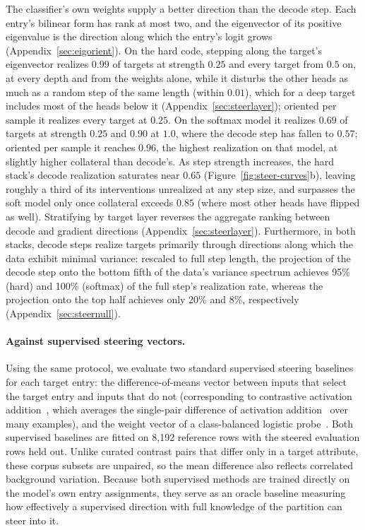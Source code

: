 The classifier's own weights supply a better direction than the decode step.
Each entry's bilinear form has rank at most two, and the eigenvector of its
positive eigenvalue is the direction along which the entry's logit grows
(Appendix~\ref{sec:eigorient}). On the hard code, stepping along the
target's eigenvector realizes $0.99$ of targets at strength $0.25$ and every
target from $0.5$ on, at every depth and from the weights alone, while it
disturbs the other heads as much as a random step of the same length (within
$0.01$), which for a deep target includes most of the heads below it
(Appendix~\ref{sec:steerlayer});
oriented per sample it realizes every target at $0.25$. On the softmax model
it realizes $0.69$ of targets at strength $0.25$ and $0.90$ at $1.0$, where
the decode step has fallen to $0.57$; oriented per sample it reaches $0.96$,
the highest realization on that model, at slightly higher collateral than
decode's. As step strength
increases, the hard stack's decode realization saturates near $0.65$
(Figure~\ref{fig:steer-curves}b), leaving roughly a third of its interventions
unrealized at any step size, and surpasses the soft model only once
collateral exceeds $0.85$ (where most other heads have flipped as well).
Stratifying by target layer reverses the aggregate ranking between decode and
gradient directions (Appendix~\ref{sec:steerlayer}). Furthermore, in both
stacks, decode steps realize targets primarily through directions along which
the data exhibit minimal variance: rescaled to full step length, the
projection of the decode step onto the bottom fifth of the data's variance
spectrum achieves 95\% (hard) and 100\% (softmax) of the full step's
realization rate, whereas the projection onto the top half achieves only
20\% and 8\%, respectively (Appendix~\ref{sec:steernull}).

\paragraph{Against supervised steering vectors.} Using the same protocol, we
evaluate two standard supervised steering baselines for each target entry:
the difference-of-means vector between inputs that select the target entry
and inputs that do not (corresponding to contrastive activation
addition~\cite{rimsky2024}, which averages the single-pair difference of
activation addition~\cite{turner2024} over many examples), and the weight
vector of a class-balanced logistic probe~\cite{wu2025axbenchsteeringllmssimple}.
Both supervised baselines are fitted on 8{,}192 reference rows with the
steered evaluation rows held out. Unlike curated contrast pairs that differ
only in a target attribute, these corpus subsets are unpaired, so the
mean difference also reflects correlated background variation. Because both
supervised methods are trained directly on the model's own entry assignments,
they serve as an oracle baseline measuring how effectively a supervised
direction with full knowledge of the partition can steer into it.

